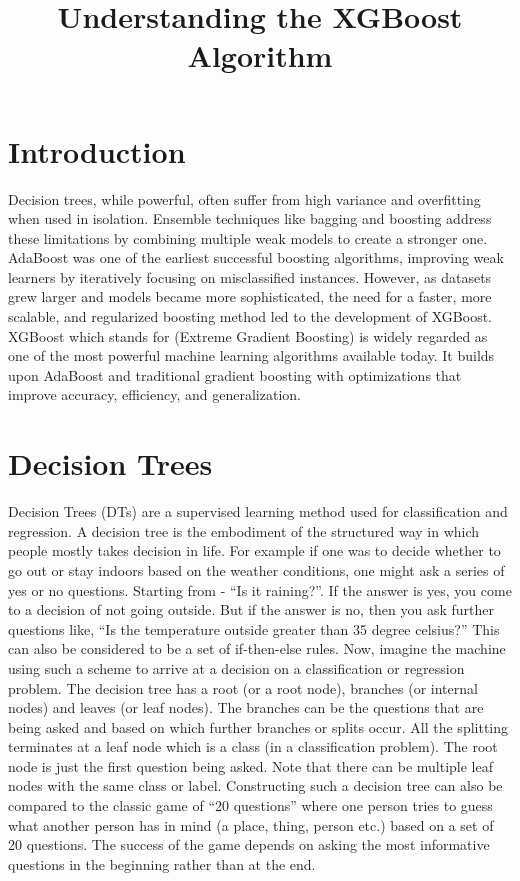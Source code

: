 \documentclass{../template/texnote}
\title{\textbf{Understanding the XGBoost Algorithm}}
\begin{document}
    \maketitle {}
\section{Introduction}

Decision trees, while powerful, often suffer from high variance and overfitting when used in isolation. Ensemble techniques like bagging and boosting address these limitations by combining multiple weak models to create a stronger one. AdaBoost was one of the earliest successful boosting algorithms, improving weak learners by iteratively focusing on misclassified instances. However, as datasets grew larger and models became more sophisticated, the need for a faster, more scalable, and regularized boosting method led to the development of XGBoost.
XGBoost which stands for (Extreme Gradient Boosting) is widely regarded as one of the most powerful machine learning algorithms available today.
It builds upon AdaBoost and traditional gradient boosting with optimizations that improve accuracy, efficiency, and generalization.

\section{Decision Trees}

Decision Trees (DTs) are a supervised learning method used for classification and regression.
A decision tree is the embodiment of the structured way in which people mostly takes decision in life.
For example if one was to decide whether to go out or stay indoors based on the weather conditions, one might ask a series of yes or no questions.
Starting from - ``Is it raining?''. If the answer is yes, you come to a decision of not going outside.
But if the answer is no, then you ask further questions like, ``Is the temperature outside greater than 35 degree celsius?''
This can also be considered to be a set of if-then-else rules.
Now, imagine the machine using such a scheme to arrive at a decision on a classification or regression problem.
The decision tree has a root (or a root node), branches (or internal nodes) and leaves (or leaf nodes).
The branches can be the questions that are being asked and based on which further branches or splits occur. All the splitting terminates at a leaf node which is a class (in a classification problem).
The root node is just the first question being asked.
Note that there can be multiple leaf nodes with the same class or label.
Constructing such a decision tree can also be compared to the classic game of ``20 questions'' where one person tries to guess what another person has in mind (a place, thing, person etc.) based on a set of 20 questions.
The success of the game depends on asking the most informative questions in the beginning rather than at the end.
\end{document}
